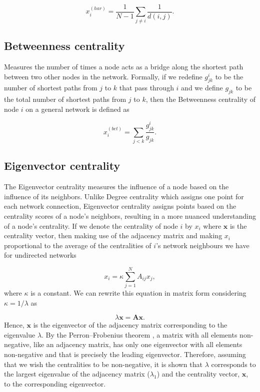 \begin{equation}
    x_i^{(har)}= \frac{1}{N-1}\sum_{j\ne i}^{}\frac{1}{d(i,j)}.
\end{equation}

\subsection*{Betweenness centrality} Measures the number of times a node acts as a bridge along the shortest path between two other nodes in the network. Formally, if we redefine $g_{jk}^i$ to be the number of shortest paths from $j$ to $k$ that pass through $i$ and we define $g_{jk}$ to be the total number of shortest paths from $j$ to $k$, then the Betweenness centrality of node $i$ on a general network is defined as

\begin{equation}
    x_i^{(bet)}= \sum_{j<k}^{}\frac{g_{jk}^i}{g_{jk}}.
\end{equation}

\subsection*{Eigenvector centrality} The Eigenvector centrality measures the influence of a node based on the influence of its neighbors. Unlike Degree centrality which assigns one point for each network connection, Eigenvector centrality assigns points based on the centrality scores of a node's neighbors, resulting in a more nuanced understanding of a node's centrality. If we denote the centrality of node $i$ by $x_i$ where $\mathbf{x}$ is the centrality vector, then making use of the adjacency matrix and making $x_i$ proportional to the average of the centralities of $i$’s network neighbours we have for undirected networks

\begin{equation}
\label{eqn:eigc}
    x_i= \kappa\sum_{j=1}^{N}A_{ij}x_j,
\end{equation}
where $\kappa$ is a constant. We can rewrite this equation in matrix form considering $\kappa=1/\lambda$ as

\begin{equation}
    \lambda \mathbf{x} = \mathbf{A}\mathbf{x}.
\end{equation}
Hence, $\mathbf{x}$ is the eigenvector of the adjacency matrix corresponding to the eigenvalue $\lambda$. By the Perron–Frobenius theorem \cite{meyer2000matrix}, a matrix with all elements non-negative, like an adjacency matrix, has only one eigenvector with all elements non-negative and that is precisely the leading eigenvector. Therefore, assuming that we wish the centralities to be non-negative, it is shown that $\lambda$ corresponds to the largest eigenvalue of the adjacency matrix ($\lambda_1$) and the centrality vector, $\mathbf{x}$, to the corresponding eigenvector.

